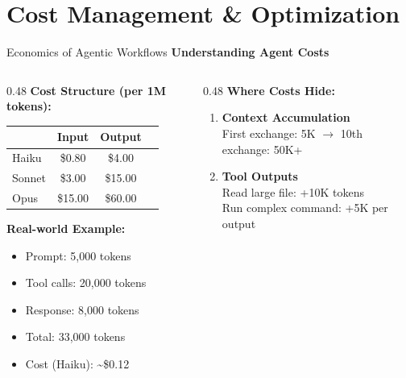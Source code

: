 \documentclass[aspectratio=169,11pt]{beamer}
\begin{document}
\section{Cost Management \& Optimization}

\begin{frame}{Economics of Agentic Workflows}
    \textbf{Understanding Agent Costs}

    \begin{columns}[T]
        \begin{column}{0.48\textwidth}
            \textbf{Cost Structure (per 1M tokens):}

            \begin{tabular}{lccc}
                \toprule
                & Input & Output\\
                \midrule
                Haiku & \$0.80 & \$4.00\\
                Sonnet & \$3.00 & \$15.00\\
                Opus & \$15.00 & \$60.00\\
                \bottomrule
            \end{tabular}

            \vspace{0.3cm}
            \textbf{Real-world Example:}
            \begin{itemize}
                \item Prompt: 5,000 tokens
                \item Tool calls: 20,000 tokens
                \item Response: 8,000 tokens
                \item Total: 33,000 tokens
                \item Cost (Haiku): \textasciitilde\$0.12
            \end{itemize}
        \end{column}
        \begin{column}{0.48\textwidth}
            \textbf{Where Costs Hide:}
            \begin{enumerate}
                \item \textbf{Context Accumulation}\\
                First exchange: 5K $\rightarrow$ 10th exchange: 50K+

                \item \textbf{Tool Outputs}\\
                Read large file: +10K tokens\\
                Run complex command: +5K per output


\end{enumerate}
\end{column}
\end{columns}
\end{frame}
\end{document}

